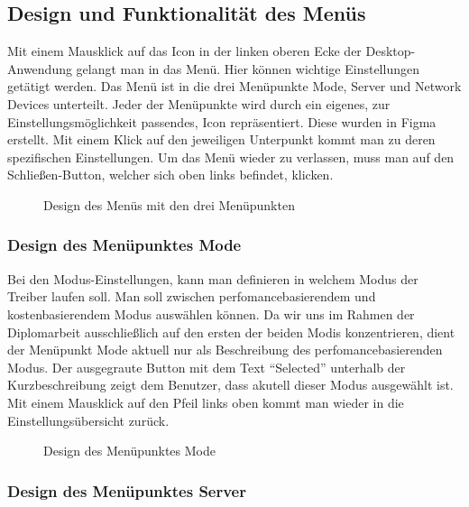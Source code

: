 \subsection{Design und Funktionalität des Menüs}
Mit einem Mausklick auf das Icon in der linken oberen Ecke der Desktop-Anwendung gelangt man in das Menü. Hier können wichtige Einstellungen getätigt werden. Das Menü ist in die drei Menüpunkte Mode, Server und Network Devices unterteilt. Jeder der Menüpunkte wird durch ein eigenes, zur Einstellungsmöglichkeit passendes, Icon repräsentiert. Diese wurden in Figma erstellt. Mit einem Klick auf den jeweiligen Unterpunkt kommt man zu deren spezifischen Einstellungen. Um das Menü wieder zu verlassen, muss man auf den Schließen-Button, welcher sich oben links befindet, klicken.
\\
\begin{figure}[H]
    \centering
    \setlength{\fboxsep}{1pt}
	\setlength{\fboxrule}{1pt}
    \caption{Design des Menüs mit den drei Menüpunkten} 
\end{figure}

\pagebreak
\subsubsection{Design des Menüpunktes Mode}

Bei den Modus-Einstellungen, kann man definieren in welchem Modus der Treiber laufen soll. Man soll zwischen perfomancebasierendem und kostenbasierendem Modus auswählen können. Da wir uns im Rahmen der Diplomarbeit ausschließlich auf den ersten der beiden Modis konzentrieren, dient der Menüpunkt Mode aktuell nur als Beschreibung des perfomancebasierenden Modus. Der ausgegraute Button mit dem Text “Selected” unterhalb der Kurzbeschreibung zeigt dem Benutzer, dass akutell dieser Modus ausgewählt ist. Mit einem Mausklick auf den Pfeil links oben kommt man wieder in die Einstellungsübersicht zurück.
\\
\begin{figure}[H]
    \centering
    \setlength{\fboxsep}{1pt}
	\setlength{\fboxrule}{1pt}
    \caption{Design des Menüpunktes Mode} 
\end{figure}

\subsubsection{Design des Menüpunktes Server}

